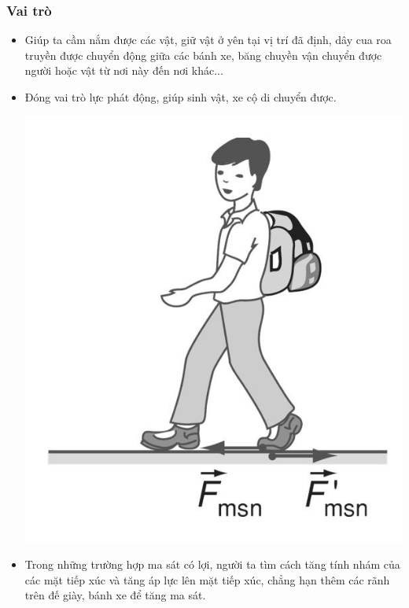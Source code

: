 \subsubsection{Vai trò}
\begin{itemize}
	\item Giúp ta cầm nắm được các vật, giữ vật ở yên tại vị trí đã định, dây cua roa truyền được chuyển động giữa các bánh xe, băng chuyền vận chuyển được người hoặc vật từ nơi này đến nơi khác...
	\item Đóng vai trò lực phát động, giúp sinh vật, xe cộ di chuyển được.
	\begin{center}
		\includegraphics[scale=0.35]{../figs/VN10-PH-15-L-012-1-V2-03.JPG}
	\end{center}
	\item Trong những trường hợp ma sát có lợi, người ta tìm cách tăng tính nhám của các mặt tiếp xúc và tăng áp lực lên mặt tiếp xúc, chẳng hạn thêm các rãnh trên đế giày, bánh xe để tăng ma sát.
\end{itemize}

